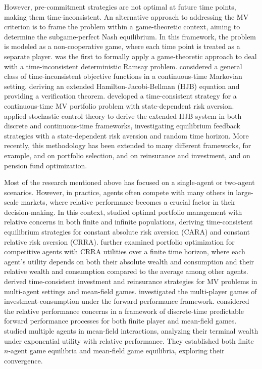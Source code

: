 \documentclass[11pt]{article}
\numberwithin{equation}{section}
\begin{document}
However, pre-commitment strategies are not optimal at future time points, making them time-inconsistent. An alternative approach to addressing the MV criterion is to frame the problem within a game-theoretic context, aiming to determine the subgame-perfect Nash equilibrium. In this framework, the problem is modeled as a non-cooperative game, where each time point is treated as a separate player.
\citet{strotz1973myopia} was the first to formally apply a game-theoretic approach to deal with a time-inconsistent deterministic Ramsay problem. \citet{bjork2017time} considered a general class of time-inconsistent objective functions in a continuous-time Markovian setting, deriving an extended Hamilton-Jacobi-Bellman (HJB) equation and providing a verification theorem. \citet{bjork2014mean} developed a time-consistent strategy for a continuous-time MV portfolio problem with state-dependent risk aversion. \citet{landriault2018equilibrium} applied stochastic control theory to derive the extended HJB system in both discrete and continuous-time frameworks, investigating equilibrium feedback strategies with a state-dependent risk aversion and random time horizon. More recently, this methodology has been extended to many different frameworks, for example, \citet{pun2018time} and \citet{yan2020robust} on portfolio selection, \citet{zeng2013time} and \citet{chen2020robust} on reinsurance and investment, \citet{liang2014optimal} and \citet{zhang2025time} on pension fund optimization.

Most of the research mentioned above has focused on a single-agent or two-agent scenarios. However, in practice, agents often compete with many others in large-scale markets, where relative performance becomes a crucial factor in their decision-making. In this context,  \citet{lacker2019mean} studied optimal portfolio management with relative concerns in both finite and infinite populations, deriving time-consistent equilibrium strategies for constant absolute risk aversion (CARA) and constant relative risk aversion (CRRA). \citet{lacker2020many} further examined portfolio optimization for competitive agents with CRRA utilities over a finite time horizon, where each agent's utility depends on both their absolute wealth and consumption and their relative wealth and consumption compared to the average among other agents. \citet{guan2022time} derived time-consistent investment and reinsurance strategies for MV problems in multi-agent settings and mean-field games. \citet{dos2022forward} investigated the multi-player games of investment-consumption under the forward performance framework. \citet{liang2023predictable} considered the relative performance concerns in a framework of discrete-time predictable forward performance processes for both finite player and mean-field games. \citet{bo2024mean} studied multiple agents in mean-field interactions, analyzing their terminal wealth under exponential utility with relative performance. They established both finite $n$-agent game equilibria and mean-field game equilibria, exploring their convergence.
\end{document}
